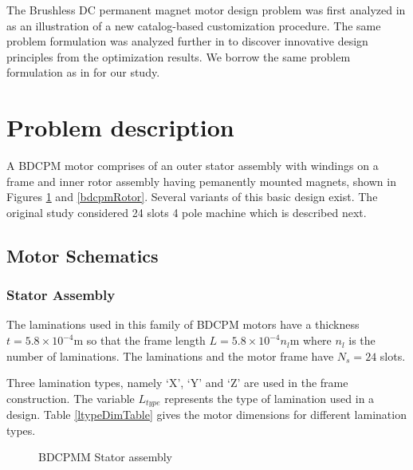 The Brushless DC permanent magnet motor design problem was first 
analyzed in \cite{chidambaram1999} as an illustration of a new
catalog-based customization procedure. The same problem formulation 
was analyzed further in \cite{deb2008} to discover innovative 
design principles from the optimization results. We borrow the same 
problem formulation as in \cite{deb2008} for our study.

\section{Problem description}
\label{problem}

A BDCPM motor comprises of an outer stator assembly with windings on a
frame  and inner rotor assembly having pemanently mounted magnets, 
shown in Figures \ref{bdcpmStator} and \ref{bdcpmRotor}. Several 
variants of this basic design exist. The original study 
\cite{chidambaram1999} considered 24 slots 4 pole machine which is 
described next.

\subsection{Motor Schematics}

\subsubsection{Stator Assembly}

The laminations used in this family of BDCPM motors have a thickness 
$t = 5.8 \times 10^{-4} \text{m}$ so that the frame length 
$L = 5.8 \times 10^{-4} n_{l} \text{m}$ where $n_l$ is the number of
laminations. The laminations and the motor frame have $N_s = 24$
slots.

Three lamination types, namely `X', `Y' and `Z' are used in the frame
construction. The variable $L_{type}$ represents the type of 
lamination used in a design. Table \ref{ltypeDimTable} gives the motor
dimensions for different lamination types.

\begin{figure}[ht]\begin{center}
 \caption{BDCPMM Stator assembly}
 \label{bdcpmStator}
\end{center}\end{figure}

